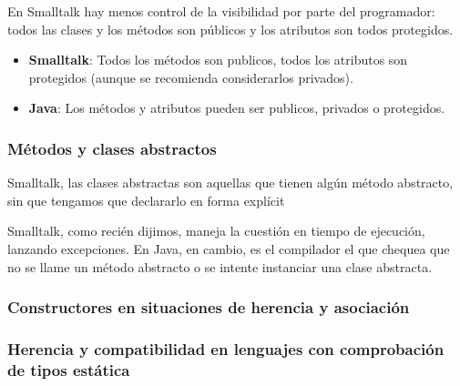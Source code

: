 \documentclass[../main.tex]{subfiles}
\begin{document}
            En Smalltalk hay menos control de la visibilidad por parte del programador: todos las clases y los métodos son públicos y los atributos son todos protegidos.

            \begin{itemize}
                \item \textbf{Smalltalk}: 
                    Todos los métodos son publicos, todos los atributos son protegidos (aunque se recomienda considerarlos privados).
                \item \textbf{Java}: 
                    Los métodos y atributos pueden ser publicos, privados o protegidos.
            \end{itemize}

        \subsubsection{Métodos y clases abstractos}
            Smalltalk, las clases abstractas son aquellas que tienen algún método abstracto, sin que tengamos que declararlo en forma explícit
            
            Smalltalk, como recién dijimos, maneja la cuestión en tiempo de ejecución, lanzando excepciones. En Java, en cambio, es el compilador el que chequea que no se llame un método abstracto o se intente instanciar una clase abstracta.
            
        \subsubsection{Constructores en situaciones de herencia y asociación}
        \subsubsection{Herencia y compatibilidad en lenguajes con comprobación de tipos estática}
\end{document}

